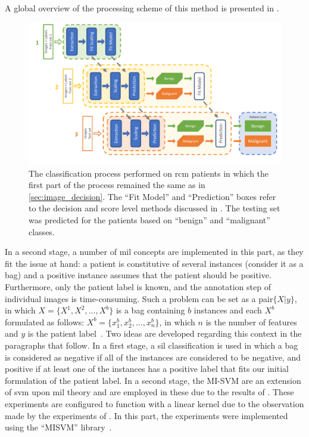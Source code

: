 \documentclass[journal,article,submit,moreauthors,pdftex, applsci]{Definitions/mdpi}
\begin{document}
A global overview of the processing scheme of this method is presented in .
\begin{figure}[h]
    \begin{center}
        \includegraphics[width=\linewidth]{Figures/Process_Decision.pdf}
        \caption{The classification process performed on \ac{rcm} patients in which the first part of the process remained the same as in \cref{sec:image_decision}. The “Fit Model” and “Prediction” boxes refer to the decision and score level methods discussed in . The testing set was predicted for the patients based on “benign” and “malignant” classes.}
        \label{fig:decision_process}
    \end{center} 
\end{figure}\par
In a second stage, a number of \ac{mil} concepts are implemented in this part, as they fit the issue at hand: a patient is constitutive of several instances (consider it as a bag) and a positive instance assumes that the patient should be positive. Furthermore, only the patient label is known, and the annotation step of individual images is time-consuming. Such a problem can be set as a pair\(\{X|y\}\), in which \(X=\{X^1,X^2,\ldots,X^b\}\) is a bag containing \(b\) instances and each \(X^b\) formulated as follows: \(X^b=\{x^b_1,x^b_2,\ldots,x^b_n\}\), in which \(n\) is the number of features and \(y\) is the patient label~\cite{foulds_frank_2010}. Two ideas are developed regarding this context in the paragraphs that follow. In a first stage, a \ac{sil} classification is used in which a bag is considered as negative if all of the instances are considered to be negative, and positive if at least one of the instances has a positive label that fits our initial formulation of the patient label. In a second stage, the MI-SVM are an extension of \ac{svm} upon \ac{mil} theory and are employed in these due to the results of . These experiments are configured to function with a linear kernel due to the observation made by the experiments of . In this part, the experiments were implemented using the “MISVM” library~\cite{Doran2014}.\par
\end{document}
